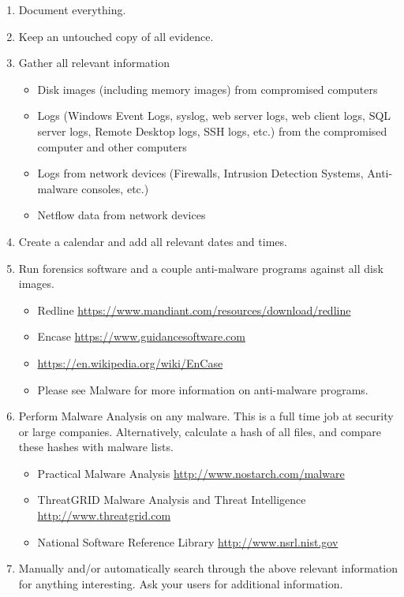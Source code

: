 \begin{enumerate}
\item Document everything.
\item Keep an untouched copy of all evidence.
\item Gather all relevant information
\begin{itemize}
\item Disk images (including memory images) from compromised computers
\item Logs (Windows Event Logs, syslog, web server logs, web client logs, SQL server logs, Remote Desktop logs, SSH logs, etc.) from the compromised computer and other computers
\item Logs from network devices (Firewalls, Intrusion Detection Systems, Anti-malware consoles, etc.)
\item Netflow data from network devices
\end{itemize}
\item Create a calendar and add all relevant dates and times.
\item Run forensics software and a couple anti-malware programs against all disk images. 
\begin{itemize}
\item Redline \url{https://www.mandiant.com/resources/download/redline}
\item Encase \url{https://www.guidancesoftware.com}
\item \url{https://en.wikipedia.org/wiki/EnCase}
\item Please see Malware for more information on anti-malware programs.
\end{itemize}
\item Perform Malware Analysis on any malware. This is a full time job at security or large companies. Alternatively, calculate a hash of all files, and compare these hashes with malware lists.
\begin{itemize}
\item Practical Malware Analysis \url{http://www.nostarch.com/malware}
\item ThreatGRID Malware Analysis and Threat Intelligence \url{http://www.threatgrid.com}
\item National Software Reference Library \url{http://www.nsrl.nist.gov}
\end{itemize}
\item Manually and/or automatically search through the above relevant information for anything interesting. Ask your users for additional information. 
\begin{itemize}

\end{itemize}
\end{enumerate}
